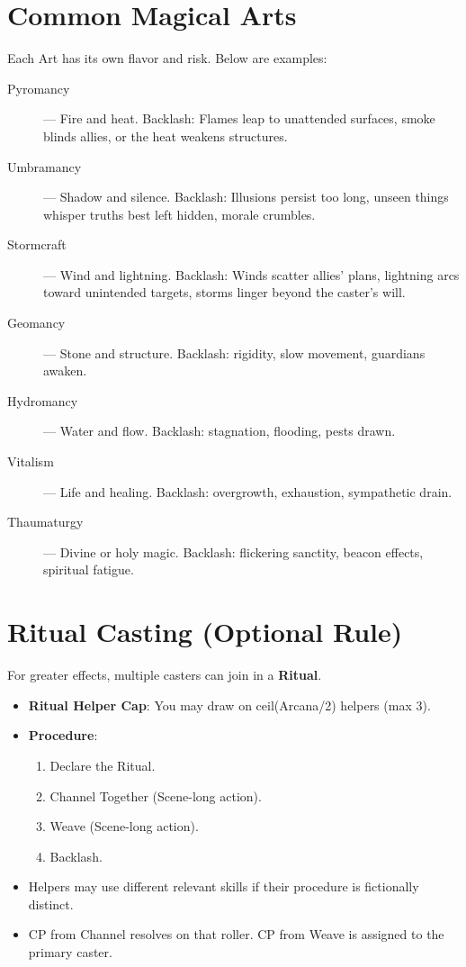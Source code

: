 \section{Common Magical Arts}

Each Art has its own flavor and risk. Below are examples:

\begin{description}
  \item[Pyromancy]  — Fire and heat. Backlash: Flames leap to unattended surfaces, smoke blinds allies, or the heat weakens structures.
  \item[Umbramancy]  — Shadow and silence. Backlash: Illusions persist too long, unseen things whisper truths best left hidden, morale crumbles.
  \item[Stormcraft]  — Wind and lightning. Backlash: Winds scatter allies' plans, lightning arcs toward unintended targets, storms linger beyond the caster's will.
  \item[Geomancy]  — Stone and structure. Backlash: rigidity, slow movement, guardians awaken.
  \item[Hydromancy]  — Water and flow. Backlash: stagnation, flooding, pests drawn.
  \item[Vitalism]  — Life and healing. Backlash: overgrowth, exhaustion, sympathetic drain.
  \item[Thaumaturgy]  — Divine or holy magic. Backlash: flickering sanctity, beacon effects, spiritual fatigue.
\end{description}

\section{Ritual Casting (Optional Rule)}

For greater effects, multiple casters can join in a \textbf{Ritual}.

\begin{itemize}
  \item \textbf{Ritual Helper Cap}: You may draw on ceil(Arcana/2) helpers (max 3).
  \item \textbf{Procedure}:
  \begin{enumerate}
    \item Declare the Ritual.
    \item Channel Together (Scene-long action).
    \item Weave (Scene-long action).
    \item Backlash.
  \end{enumerate}
  \item Helpers may use different relevant skills if their procedure is fictionally distinct.
  \item CP from Channel resolves on that roller. CP from Weave is assigned to the primary caster.
\end{itemize}

